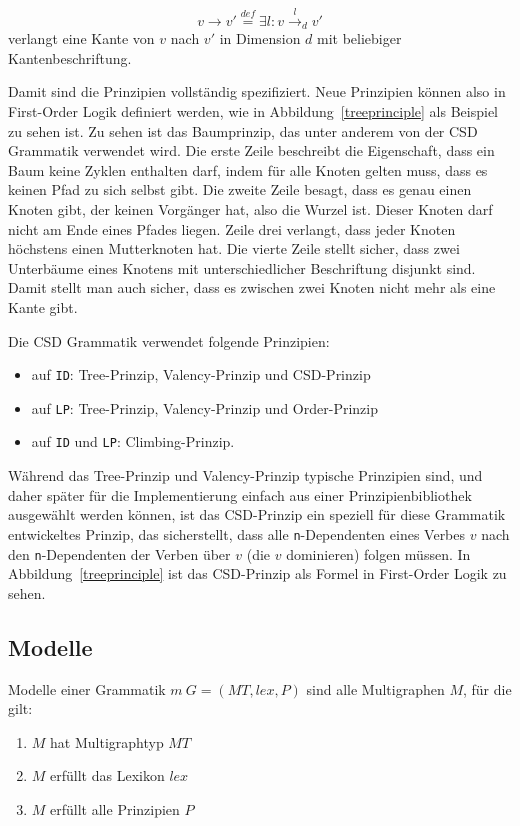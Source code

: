 $$v \rightarrow v' \overset{\mathit{def}}{=} \exists l : v
\overset{l}{\rightarrow}_d v'$$ verlangt eine Kante von $v$ nach $v'$
in Dimension $d$ mit beliebiger Kantenbeschriftung.

Damit sind die Prinzipien vollst\"andig spezifiziert. Neue Prinzipien
k\"onnen also in First-Order Logik definiert werden, wie in
Abbildung~\ref{treeprinciple} als Beispiel zu sehen ist. Zu sehen ist
das Baumprinzip, das unter anderem von der CSD Grammatik verwendet
wird. Die erste Zeile beschreibt die Eigenschaft, dass ein Baum keine
Zyklen enthalten darf, indem f\"ur alle Knoten gelten muss, dass es
keinen Pfad zu sich selbst gibt. Die zweite Zeile besagt, dass es
genau einen Knoten gibt, der keinen Vorg\"anger hat, also die Wurzel
ist. Dieser Knoten darf nicht am Ende eines Pfades liegen. Zeile drei
verlangt, dass jeder Knoten h\"ochstens einen Mutterknoten hat.  Die
vierte Zeile stellt sicher, dass zwei Unterb\"aume eines Knotens mit
unterschiedlicher Beschriftung disjunkt sind. Damit stellt man auch
sicher, dass es zwischen zwei Knoten nicht mehr als eine Kante gibt.

Die CSD Grammatik verwendet folgende Prinzipien:
\begin{itemize}
\item auf {\tt ID}: Tree-Prinzip, Valency-Prinzip und CSD-Prinzip
\item auf {\tt LP}: Tree-Prinzip, Valency-Prinzip und Order-Prinzip
\item auf {\tt ID} und {\tt LP}: Climbing-Prinzip.
\end{itemize}
W\"ahrend das Tree-Prinzip und Valency-Prinzip typische Prinzipien
sind, und daher sp\"ater f\"ur die Implementierung einfach aus einer
Prinzipienbibliothek ausgew\"ahlt werden k\"onnen, ist das CSD-Prinzip
ein speziell f\"ur diese Grammatik entwickeltes Prinzip, das
sicherstellt, dass alle {\tt n}-Dependenten eines Verbes $v$ nach den
{\tt n}-Dependenten der Verben \"uber $v$ (die $v$ dominieren) folgen
m\"ussen. In Abbildung~\ref{treeprinciple} ist das CSD-Prinzip als
Formel in First-Order Logik zu sehen.

\subsection{Modelle}

Modelle einer Grammatik $m\ G = (\mathit{MT}, \mathit{lex}, P)$ sind
alle Multigraphen $M$, f\"ur die gilt:
\begin{enumerate}
\item $M$ hat Multigraphtyp $\mathit{MT}$
\item $M$ erf\"ullt das Lexikon $\mathit{lex}$
\item $M$ erf\"ullt alle Prinzipien $P$
\end{enumerate}

